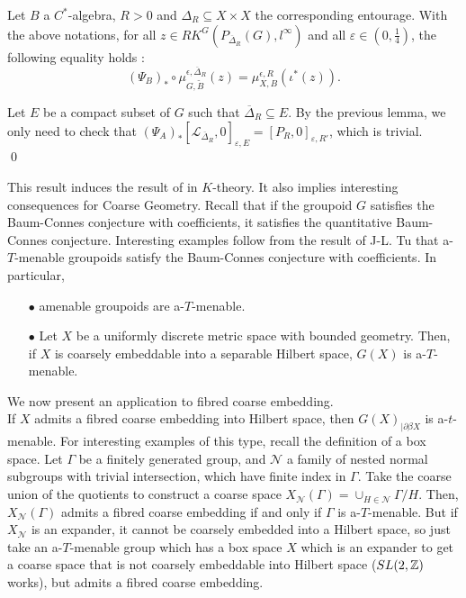 \begin{thm}
Let $B$ a $C^*$-algebra, $R>0$ and $\Delta_R\subseteq X\times X$ the corresponding entourage. With the above notations, for all $z\in RK^G(P_{\overline \Delta_R}(G),l^\infty)$ and all $\varepsilon\in(0,\frac{1}{4})$, the following equality holds :
\[(\Psi_B)_*\circ\mu^{\epsilon,\overline\Delta_R}_{G,\tilde B} (z) = \mu_{X,B}^{\epsilon,R}(\iota^*(z)).\]
\end{thm}

\begin{dem}
Let $E$ be a compact subset of $G$ such that $\overline \Delta_R \subseteq E$.
By the previous lemma, we only need to check that $(\Psi_A)_*[\mathcal L_{\overline \Delta_R},0]_{\varepsilon,E} = [P_R,0]_{\varepsilon, R'} $, which is trivial.\\
\qed
\end{dem}

This result induces the result of \cite{SkTuYu} in $K$-theory. It also implies interesting consequences for Coarse Geometry. Recall that if the groupoid $G$ satisfies the Baum-Connes conjecture with coefficients, it satisfies the quantitative Baum-Connes conjecture. Interesting examples follow from the result of J-L. Tu \cite{TuThese} that a-$T$-menable groupoids satisfy the Baum-Connes conjecture with coefficients. In particular, \\

\begin{itemize}
\item[$\bullet$] amenable groupoids are a-$T$-menable.\\
\item[$\bullet$] Let $X$ be a uniformly discrete metric space with bounded geometry. Then, if $X$ is coarsely embeddable into a separable Hilbert space, $G(X)$ is a-$T$-menable.\cite{SkTuYu} \\
\end{itemize}

We now present an application to fibred coarse embedding.\\

If $X$ admits a fibred coarse embedding into Hilbert space, then $G(X)_{|\partial \beta X}$ is a-$t$-menable.\cite{FinnSellFibred} For interesting examples of this type, recall the definition of a box space. Let $\Gamma$ be a finitely generated group, and $\mathcal N$ a family of nested normal subgroups with trivial intersection, which have finite index in $\Gamma$. Take the coarse union of the quotients to construct a coarse space $X_{\mathcal N}(\Gamma)= \cup_{H\in \mathcal N } \Gamma/ H$. Then, $X_{\mathcal N}(\Gamma)$ admits a fibred coarse embedding if and only if $\Gamma$ is a-$T$-menable. But if $X_{\mathcal N}$ is an expander, it cannot be coarsely embedded into a Hilbert space, so just take an a-$T$-menable group which has a box space $X$ which is an expander to get a coarse space that is not coarsely embeddable into Hilbert space ($SL(2,\mathbb Z)$ works), but admits a fibred coarse embedding.\\

